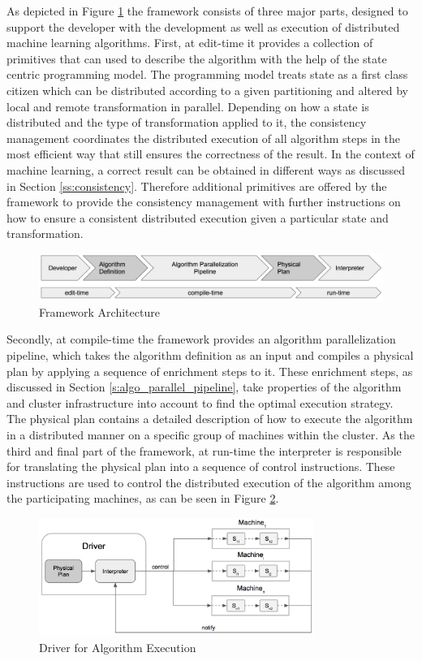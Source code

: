 As depicted in Figure \ref{fig:framework_architecture} the framework consists of three major parts, designed to support the developer with the development as well as execution of distributed machine learning algorithms.
First, at edit-time it provides a collection of primitives that can used to describe the algorithm with the help of the state centric programming model.
The programming model treats state as a first class citizen which can be distributed according to a given partitioning and altered by local and remote transformation in parallel.
Depending on how a state is distributed and the type of transformation applied to it, the consistency management coordinates the distributed execution of all algorithm steps in the most efficient way that still ensures the correctness of the result.
In the context of machine learning, a correct result can be obtained in different ways as discussed in Section \ref{ss:consistency}.
Therefore additional primitives are offered by the framework to provide the consistency management with further instructions on how to ensure a consistent distributed execution given a particular state and transformation.
\begin{figure}[ht]
\centering
\includegraphics[width=1.0\textwidth]{img/framework_architecture.png}
\caption{Framework Architecture}
\label{fig:framework_architecture}
\end{figure}
Secondly, at compile-time the framework provides an algorithm parallelization pipeline, which takes the algorithm definition as an input and compiles a physical plan by applying a sequence of enrichment steps to it.
These enrichment steps, as discussed in Section \ref{s:algo_parallel_pipeline}, take properties of the algorithm and cluster infrastructure into account to find the optimal execution strategy.
The physical plan contains a detailed description of how to execute the algorithm in a distributed manner on a specific group of machines within the cluster.
As the third and final part of the framework, at run-time the interpreter is responsible for translating the physical plan into a sequence of control instructions.
These instructions are used to control the distributed execution of the algorithm among the participating machines, as can be seen in Figure \ref{fig:framework_driver}.
\begin{figure}[ht]
\centering
\includegraphics[width=0.8\textwidth]{img/framework_driver.png}
\caption{Driver for Algorithm Execution}
\label{fig:framework_driver}
\end{figure}
